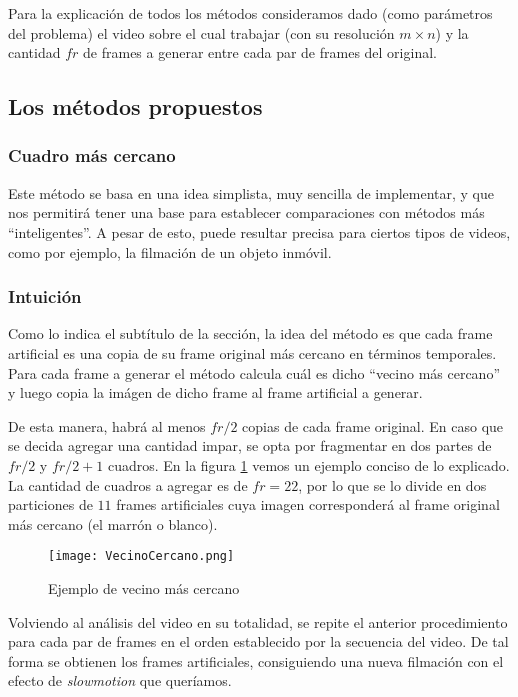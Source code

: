 Para la explicación de todos los métodos consideramos dado (como parámetros del problema) el video sobre el cual trabajar (con su resolución $m \times n$) y la cantidad $fr$ de frames a generar entre cada par de frames del original.

\subsection{Los m\'etodos propuestos}
\subsubsection{Cuadro m\'as cercano}

Este m\'etodo se basa en una idea simplista, muy sencilla de implementar, y que nos permitirá tener una base para establecer comparaciones con métodos más ``inteligentes''. A pesar de esto, puede resultar precisa para ciertos tipos de videos, como por ejemplo, la filmaci\'on de un objeto inmóvil.

\subsubsection*{\bf{Intuición}}

Como lo indica el subt\'itulo de la secci\'on, la idea del método es que cada frame artificial es una copia de su frame original más cercano en términos temporales. Para cada frame a generar el método calcula cuál es dicho ``vecino más cercano'' y luego copia la im\'agen de dicho frame al frame artificial a generar. 

De esta manera, habr\'a al menos $fr/2$ copias de cada frame original. En caso que se decida agregar una cantidad impar, se opta por fragmentar en dos partes de $fr/2$ y $fr/2+1$ cuadros. En la figura \ref{fig:vecino} vemos un ejemplo conciso de lo explicado. La cantidad de cuadros a agregar es de $fr = 22$, por lo que se lo divide en dos particiones de $11$ frames artificiales cuya imagen corresponder\'a al frame original m\'as cercano (el marr\'on o blanco).

\begin{figure}[h!]
  \centering
    \texttt{[image: VecinoCercano.png]}
     \caption{Ejemplo de vecino m\'as cercano}\label{fig:vecino}
\end{figure}
\noindent

Volviendo al an\'alisis del video en su totalidad, se repite el anterior procedimiento para cada par de frames en el orden establecido por la secuencia del video. De tal forma se obtienen los frames artificiales, consiguiendo una nueva filmaci\'on con el efecto de \textit{slowmotion} que queríamos. 


